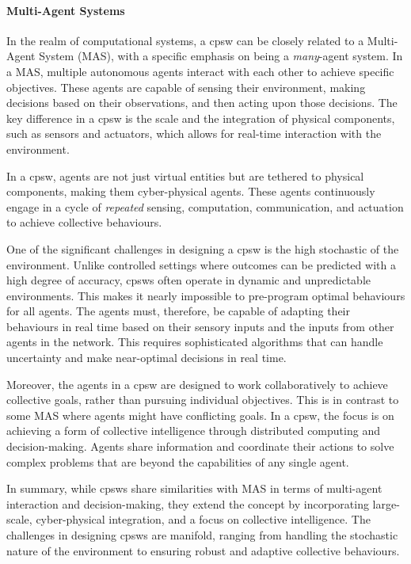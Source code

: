 \paragraph*{Multi-Agent Systems}
In the realm of computational systems, a \ac{cpsw} can be closely related to a Multi-Agent System (MAS), 
 with a specific emphasis on being a \emph{many}-agent system. 
 In a MAS, multiple autonomous agents interact with each other to achieve specific objectives. 
 These agents are capable of sensing their environment, making decisions based on their observations, and then acting upon those decisions. 
 The key difference in a \ac{cpsw} is the scale and the integration of physical components, such as sensors and actuators, which allows for real-time interaction with the environment.

In a \ac{cpsw}, agents are not just virtual entities but are tethered to physical components, making them cyber-physical agents. 
 These agents continuously engage in a cycle of \emph{repeated} sensing, computation, communication, and actuation to achieve collective behaviours. 

One of the significant challenges in designing a \ac{cpsw} is the high stochastic of the environment. 
 Unlike controlled settings where outcomes can be predicted with a high degree of accuracy, \acp{cpsw} often operate in dynamic and unpredictable environments. 
 This makes it nearly impossible to pre-program optimal behaviours for all agents. 
 The agents must, therefore, be capable of adapting their behaviours in real time based on their sensory inputs and the inputs from other agents in the network. 
 This requires sophisticated algorithms that can handle uncertainty and make near-optimal decisions in real time.

Moreover, the agents in a \ac{cpsw} are designed to work collaboratively to achieve collective goals, 
 rather than pursuing individual objectives. 
 This is in contrast to some MAS where agents might have conflicting goals. 
 In a \ac{cpsw}, the focus is on achieving a form of collective intelligence through distributed computing and decision-making. 
 Agents share information and coordinate their actions to solve complex problems that are beyond the capabilities of any single agent.

In summary, while \acp{cpsw} share similarities with MAS in terms of multi-agent interaction and decision-making, they extend the concept by incorporating large-scale, cyber-physical integration, and a focus on collective intelligence. 
 The challenges in designing \acp{cpsw} are manifold, ranging from handling the stochastic nature of the environment to ensuring robust and adaptive collective behaviours.

